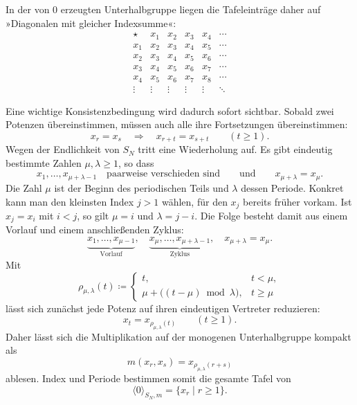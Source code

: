 \documentclass[main.tex]{subfiles}
\begin{document}
In der von \(0\) erzeugten Unterhalbgruppe liegen die Tafeleinträge daher
auf »Diagonalen mit gleicher Indexsumme«:
\[
\begin{array}{c|ccccc}
\star &x_1&x_2&x_3&x_4&\cdots\\\hline
x_1&x_2&x_3&x_4&x_5&\cdots\\
x_2&x_3&x_4&x_5&x_6&\cdots\\
x_3&x_4&x_5&x_6&x_7&\cdots\\
x_4&x_5&x_6&x_7&x_8&\cdots\\
\vdots&\vdots&\vdots&\vdots&\vdots&\ddots
\end{array}
\]

Eine wichtige Konsistenzbedingung wird dadurch sofort sichtbar.  Sobald
zwei Potenzen übereinstimmen, müssen auch alle ihre Fortsetzungen
übereinstimmen:
\[
  x_r=x_s
  \quad\Longrightarrow\quad
  x_{r+t}=x_{s+t}
  \qquad(t\geq1).
\]
Wegen der Endlichkeit von \(S_N\) tritt eine Wiederholung auf.  Es gibt
eindeutig bestimmte Zahlen \(\mu,\lambda\geq1\), so dass
\[
  x_1,\ldots,x_{\mu+\lambda-1}
  \quad\text{paarweise verschieden sind}
  \qquad\text{und}\qquad
  x_{\mu+\lambda}=x_\mu.
\]
Die Zahl \(\mu\) ist der Beginn des periodischen Teils und \(\lambda\) dessen
Periode.  Konkret kann man den kleinsten Index \(j>1\) wählen, für den
\(x_j\) bereits früher vorkam.  Ist \(x_j=x_i\) mit \(i<j\), so gilt
\(\mu=i\) und \(\lambda=j-i\).  Die Folge besteht damit aus einem Vorlauf
und einem anschließenden Zyklus:
\[
  \underbrace{x_1,\ldots,x_{\mu-1}}_{\text{Vorlauf}},
  \quad
  \underbrace{x_\mu,\ldots,x_{\mu+\lambda-1}}_{\text{Zyklus}},
  \quad
  x_{\mu+\lambda}=x_\mu.
\]
Mit
\[
  \rho_{\mu,\lambda}(t)
  \coloneqq
  \begin{cases}
    t,&t<\mu,\\
    \mu+\bigl((t-\mu)\bmod\lambda\bigr),&t\geq\mu
  \end{cases}
\]
lässt sich zunächst jede Potenz auf ihren eindeutigen Vertreter reduzieren:
\[
  \boxed{x_t=x_{\rho_{\mu,\lambda}(t)}}\qquad(t\geq1).
\]
Daher lässt sich die Multiplikation auf der monogenen Unterhalbgruppe kompakt als
\[
  \boxed{
    m(x_r,x_s)=x_{\rho_{\mu,\lambda}(r+s)}
  }
\]
ablesen.  Index und Periode bestimmen somit die gesamte Tafel von
\[
  \langle0\rangle_{S_N,m}=\{x_r\mid r\geq1\}.
\]
\end{document}
